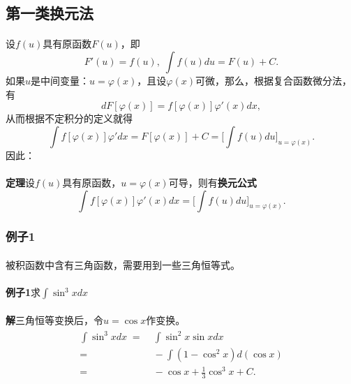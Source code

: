 \subsection{第一类换元法}
\paragraph{}
设$f(u)$具有原函数$F(u)$，即
\begin{equation}
  F'(u) = f(u), \; \int{f(u)du} = F(u) + C.
\end{equation}
如果$u$是中间变量：$u=\varphi(x)$，且设$\varphi(x)$可微，那么，根据复合函数微分法，有
\begin{equation}
  dF[\varphi(x)] = f[\varphi(x)]\varphi'(x)dx,
\end{equation}
从而根据不定积分的定义就得
\begin{equation}
 \int f[\varphi(x)]\varphi'dx=F[\varphi(x)] + C = \big[\int f(u)du\big]_{u=\varphi(x)}.
\end{equation}
因此：

\paragraph{}
\textbf{定理\;}设$f(u)$具有原函数，$u=\varphi(x)$可导，则有\textbf{换元公式}
\begin{equation}
  \int f[\varphi(x)]\varphi'(x)dx = \big[\int f(u)du\big]_{u=\varphi(x)}.
\end{equation}

\subsubsection{例子1}
\paragraph{}
被积函数中含有三角函数，需要用到一些三角恒等式。

\paragraph{}
\textbf{例子1\;}求$\displaystyle\int{\sin^3xdx}$

\paragraph{}
\textbf{解\;}三角恒等变换后，令$u=\cos{x}$作变换。
\begin{align*}
\begin{split}
  \int\sin^3xdx \;=&\; \int\sin^2x\sin{x}dx \\
  =&\; -\int(1-\cos^2x)d(\cos{x}) \\
  =&\; -\cos{x} + \frac{1}{3}\cos^3{x} + C.
\end{split}
\end{align*}

